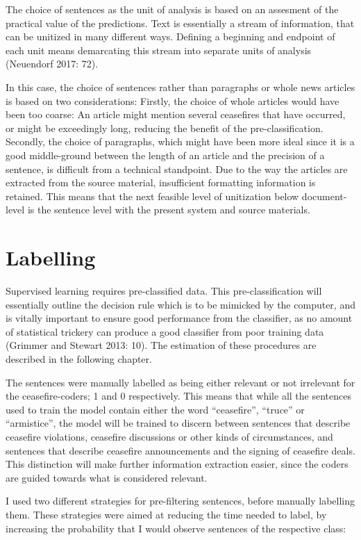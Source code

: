 \documentclass[12pt,twoside]{reedthesis}
\begin{document}
The choice of sentences as the unit of analysis is based on an assesment
of the practical value of the predictions. Text is essentially a stream
of information, that can be unitized in many different ways. Defining a
beginning and endpoint of each unit means demarcating this stream into
separate units of analysis (Neuendorf 2017: 72).

In this case, the choice of sentences rather than paragraphs or whole
news articles is based on two considerations: Firstly, the choice of
whole articles would have been too coarse: An article might mention
several ceasefires that have occurred, or might be exceedingly long,
reducing the benefit of the pre-classification. Secondly, the choice of
paragraphs, which might have been more ideal since it is a good
middle-ground between the length of an article and the precision of a
sentence, is difficult from a technical standpoint. Due to the way the
articles are extracted from the source material, insufficient formatting
information is retained. This means that the next feasible level of
unitization below document-level is the sentence level with the present
system and source materials.

\section{Labelling}\label{labelling}

Supervised learning requires pre-classified data. This
pre-classification will essentially outline the decision rule which is
to be mimicked by the computer, and is vitally important to ensure good
performance from the classifier, as no amount of statistical trickery
can produce a good classifier from poor training data (Grimmer and
Stewart 2013: 10). The estimation of these procedures are described in
the following chapter.

The sentences were manually labelled as being either relevant or not
irrelevant for the ceasefire-coders; 1 and 0 respectively. This means
that while all the sentences used to train the model contain either the
word ``ceasefire'', ``truce'' or ``armistice'', the model will be
trained to discern between sentences that describe ceasefire violations,
ceasefire discussions or other kinds of circumstances, and sentences
that describe ceasefire announcements and the signing of ceasefire
deals. This distinction will make further information extraction easier,
since the coders are guided towards what is considered relevant.

I used two different strategies for pre-filtering sentences, before
manually labelling them. These strategies were aimed at reducing the
time needed to label, by increasing the probability that I would observe
sentences of the respective class:
\end{document}
